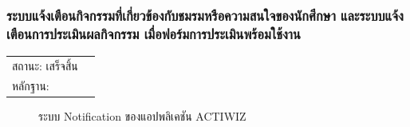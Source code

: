 \documentclass[14pt,oneside,openright,a4paper]{cpe-thai-project}
\begin{document}
\subsubsection{ระบบแจ้งเตือนกิจกรรมที่เกี่ยวข้องกับชมรมหรือความสนใจของนักศึกษา และระบบแจ้งเตือนการประเมินผลกิจกรรม เมื่อฟอร์มการประเมินพร้อมใช้งาน}
\begin{tabular}{@{}p{2cm}p{10cm}@{}}
  สถานะ: เสร็จสิ้น \\
  หลักฐาน: & \\
  \end{tabular}
\begin{figure}[!h]\centering
  \setlength{\fboxrule}{0.5mm} %
  \setlength{\fboxsep}{0.5cm}
  \caption{ระบบ Notification ของแอปพลิเคชัน ACTIWIZ }\label{fig:Notification}
\end{figure}

\newpage
\end{document}
